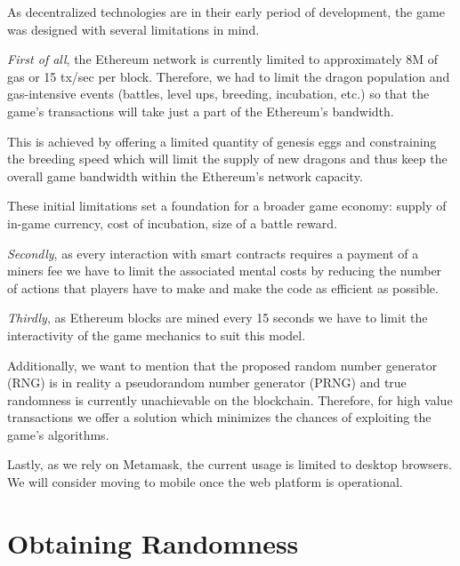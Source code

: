 \documentclass[12pt]{article}
\begin{document}
As decentralized technologies are in their early period of development, the game was designed with several limitations in mind.\par

\textit{First of all}, the Ethereum network is currently limited to approximately 8M of gas or 15 tx/sec per block. Therefore, we had to limit the dragon population and gas-intensive events (battles, level ups, breeding, incubation, etc.) so that the game’s transactions will take just a part of the Ethereum’s bandwidth.\par

This is achieved by offering a limited quantity of genesis eggs and constraining the breeding speed which will limit the supply of new dragons and thus keep the overall game bandwidth within the Ethereum’s network capacity.\par

These initial limitations set a foundation for a broader game economy: supply of in-game currency, cost of incubation, size of a battle reward.\par

\textit{Secondly}, as every interaction with smart contracts requires a payment of a miners fee we have to limit the associated mental costs by reducing the number of actions that players have to make and make the code as efficient as possible.\par

\textit{Thirdly}, as Ethereum blocks are mined every 15 seconds we have to limit the interactivity of the game mechanics to suit this model.\par

Additionally, we want to mention that the proposed random number generator (RNG) is in reality a pseudorandom number generator (PRNG) and true randomness is currently unachievable on the blockchain. Therefore, for high value transactions we offer a solution which minimizes the chances of exploiting the game’s algorithms.\par

Lastly, as we rely on Metamask, the current usage is limited to desktop browsers. We will  consider moving to mobile once the web platform is operational.


\newpage
\vspace{\baselineskip}\section{Obtaining Randomness}
\label{Obtaining Randomness}   \par
\end{document}
